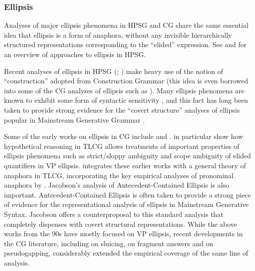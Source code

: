 \documentclass[output=paper,biblatex,babelshorthands,newtxmath,draftmode,colorlinks,citecolor=brown]{langscibook}
\begin{document}
\subsubsection{Ellipsis}

Analyses of major ellipsis phenomena in HPSG and CG share the same
essential idea that ellipsis is a form of anaphora, without any
invisible hierarchically structured representations corresponding to
the ``elided'' expression. See  and
\citet{ginzburg-miller-ellipsis-handbook} for an
overview of approaches to ellipsis in HPSG.

\largerpage
Recent analyses of ellipsis in HPSG (\citealt[Chapter~8]{GSag2000a-u}; \citealt{millereisspseudo})
make heavy use of the notion of ``construction'' adopted from
Construction Grammar (this idea is even borrowed into some of the CG
analyses of ellipsis such as \citealt{Jacobson2016}). Many ellipsis phenomena
are known to exhibit some form of syntactic sensitivity
\citep{kennedy2003,chung13,yoshida-ea-pg}, and this fact has long been
taken to provide strong evidence for the ``covert structure'' analyses
of ellipsis popular in Mainstream Generative Grammar \citep{merchant13}.

Some of the early works on ellipsis in CG include
\citet{hendriks-diss} and \citet{morrillmerenciano1996}.
\citet{morrillmerenciano1996} in particular show how hypothetical
reasoning in TLCG allows treatments of important properties of
ellipsis phenomena such as strict/sloppy ambiguity and scope ambiguity
of elided quantifiers in VP ellipsis. \citet{jaeger05} integrates
these earlier works with a general theory of anaphora in TLCG,
incorporating the key empirical analyses of pronominal anaphora by
\citet{Jacobson1999a,Jacobson2000a}. Jacobson's
\citeyearpar{Jacobson_p1998a,Jacobson2008} analysis of
Antecedent-Contained Ellipsis is also important. Antecedent-Contained
Ellipsis is often taken to provide a strong piece of evidence for the
representational analysis of ellipsis in Mainstream Generative Syntax.
Jacobson offers a counterproposal to this standard analysis that
completely dispenses with covert structural representations. While the
above works from the 90s have mostly focused on VP ellipsis, recent
developments in the CG literature, including \citet{barker-sluicing}
on sluicing, \citet{Jacobson2016} on fragment answers and
\citet{kubota-levine-pseudo} on pseudogapping, considerably extended
the empirical coverage of the same line of analysis.
\end{document}
